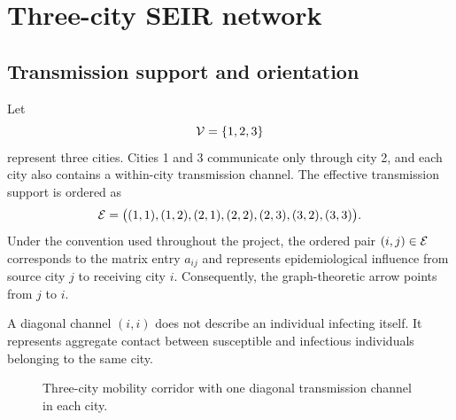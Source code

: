 \section{Three-city SEIR network}
\label{sec:network}

\subsection{Transmission support and orientation}

Let
\[
\mathcal{V}=\{1,2,3\}
\]
represent three cities. Cities 1 and 3 communicate only through city 2, and
each city also contains a within-city transmission channel. The effective
transmission support is ordered as
\[
\mathcal{E}=
\bigl(
(1,1),(1,2),(2,1),(2,2),(2,3),(3,2),(3,3)
\bigr).
\]
Under the convention used throughout the project, the ordered pair
$(i,j)\in\mathcal{E}$ corresponds to the matrix entry $a_{ij}$ and represents
epidemiological influence from source city $j$ to receiving city $i$.
Consequently, the graph-theoretic arrow points from $j$ to $i$.

A diagonal channel $(i,i)$ does not describe an individual infecting itself.
It represents aggregate contact between susceptible and infectious individuals
belonging to the same city.

\begin{figure}[ht]
\centering
{}
\caption{Three-city mobility corridor with one diagonal transmission channel in each city.}
\label{fig:three_city_network}
\end{figure}

